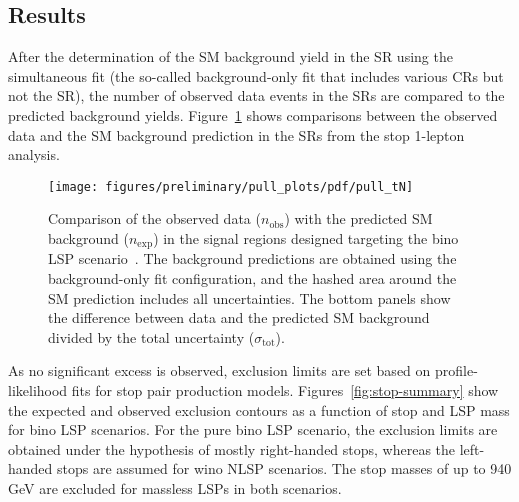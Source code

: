 \documentclass[UKenglish,10pt]{article}
\begin{document}
\subsection{Results}

After the determination of the SM background yield in the SR using the simultaneous fit (the so-called background-only fit that includes various CRs but not the SR), the number of observed data events in the SRs are compared to the predicted background yields. Figure~\ref{fig:pulls-tN} shows comparisons between the observed data and the SM background prediction in the SRs from the stop 1-lepton analysis.
%
\begin{figure}[htbp]
        \centering
        \texttt{[image: figures/preliminary/pull\_plots/pdf/pull\_tN]} \\
        \caption{Comparison of the observed data ($n_\text{obs}$) with the predicted SM background ($n_\text{exp}$) in the signal regions designed targeting the bino LSP scenario~\cite{ATL-CONF-2017-037}. The background predictions are obtained using the background-only fit configuration, and the hashed area around the SM prediction includes all uncertainties. The bottom panels show the difference between data and the predicted SM background divided by the total uncertainty ($\sigma_\text{tot}$).
        }
        \label{fig:pulls-tN}
\end{figure}

\vspace{0.20cm}

\hspace{-0.60cm}
As no significant excess is observed, exclusion limits are set based on profile-likelihood fits for stop pair production models. Figures~\ref{fig:stop-summary} show the expected and observed exclusion contours as a function of stop and LSP mass for bino LSP scenarios. For the pure bino LSP scenario, the exclusion limits are obtained under the hypothesis of mostly right-handed stops, whereas the left-handed stops are assumed for wino NLSP scenarios. The stop masses of up to 940 GeV are excluded for massless LSPs in both scenarios.
\vspace{0.20cm}
\end{document}
